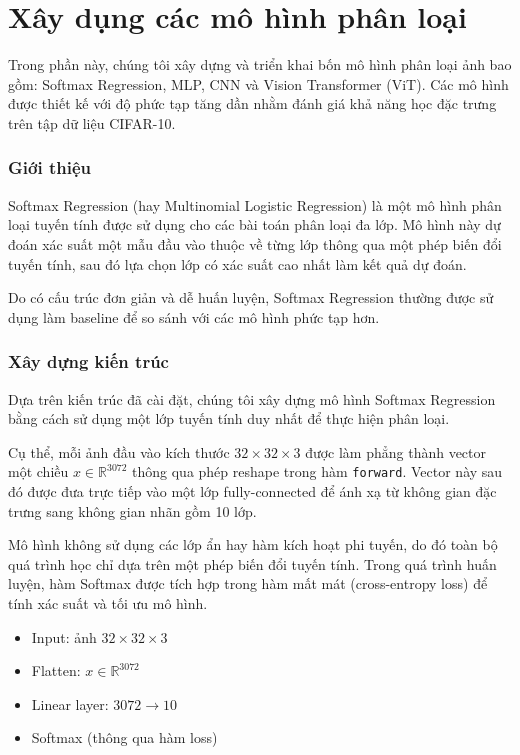 \section{Xây dụng các mô hình phân loại}

Trong phần này, chúng tôi xây dựng và triển khai bốn mô hình phân loại ảnh bao gồm: Softmax Regression, MLP, CNN và Vision Transformer (ViT). Các mô hình được thiết kế với độ phức tạp tăng dần nhằm đánh giá khả năng học đặc trưng trên tập dữ liệu CIFAR-10.

\subsubsection{Giới thiệu}

Softmax Regression (hay Multinomial Logistic Regression) là một mô hình phân loại tuyến tính được sử dụng cho các bài toán phân loại đa lớp. Mô hình này dự đoán xác suất một mẫu đầu vào thuộc về từng lớp thông qua một phép biến đổi tuyến tính, sau đó lựa chọn lớp có xác suất cao nhất làm kết quả dự đoán.

Do có cấu trúc đơn giản và dễ huấn luyện, Softmax Regression thường được sử dụng làm baseline để so sánh với các mô hình phức tạp hơn.

\subsubsection{Xây dựng kiến trúc}

Dựa trên kiến trúc đã cài đặt, chúng tôi xây dựng mô hình Softmax Regression bằng cách sử dụng một lớp tuyến tính duy nhất để thực hiện phân loại.

Cụ thể, mỗi ảnh đầu vào kích thước $32 \times 32 \times 3$ được làm phẳng thành vector một chiều $x \in \mathbb{R}^{3072}$ thông qua phép reshape trong hàm \texttt{forward}. Vector này sau đó được đưa trực tiếp vào một lớp fully-connected để ánh xạ từ không gian đặc trưng sang không gian nhãn gồm 10 lớp.

Mô hình không sử dụng các lớp ẩn hay hàm kích hoạt phi tuyến, do đó toàn bộ quá trình học chỉ dựa trên một phép biến đổi tuyến tính. Trong quá trình huấn luyện, hàm Softmax được tích hợp trong hàm mất mát (cross-entropy loss) để tính xác suất và tối ưu mô hình.

\begin{itemize}
\item Input: ảnh $32 \times 32 \times 3$
\item Flatten: $x \in \mathbb{R}^{3072}$
\item Linear layer: $3072 \rightarrow 10$
\item Softmax (thông qua hàm loss)
\end{itemize}

